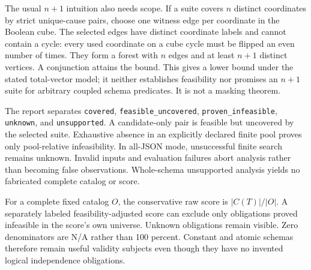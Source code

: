 \documentclass[sigconf,nonacm]{acmart}
\begin{document}
The usual $n+1$ intuition also needs scope. If a suite covers $n$ distinct coordinates by strict unique-cause pairs, choose one witness edge per coordinate in the Boolean cube. The selected edges have distinct coordinate labels and cannot contain a cycle: every used coordinate on a cube cycle must be flipped an even number of times. They form a forest with $n$ edges and at least $n+1$ distinct vertices. A conjunction attains the bound. This gives a lower bound under the stated total-vector model; it neither establishes feasibility nor promises an $n+1$ suite for arbitrary coupled schema predicates. It is not a masking theorem.

The report separates \texttt{c\allowbreak{}o\allowbreak{}v\allowbreak{}e\allowbreak{}r\allowbreak{}e\allowbreak{}d}, \texttt{f\allowbreak{}e\allowbreak{}a\allowbreak{}s\allowbreak{}i\allowbreak{}b\allowbreak{}l\allowbreak{}e\allowbreak{}\_\allowbreak{}u\allowbreak{}n\allowbreak{}c\allowbreak{}o\allowbreak{}v\allowbreak{}e\allowbreak{}r\allowbreak{}e\allowbreak{}d}, \texttt{p\allowbreak{}r\allowbreak{}o\allowbreak{}v\allowbreak{}e\allowbreak{}n\allowbreak{}\_\allowbreak{}i\allowbreak{}n\allowbreak{}f\allowbreak{}e\allowbreak{}a\allowbreak{}s\allowbreak{}i\allowbreak{}b\allowbreak{}l\allowbreak{}e}, \texttt{u\allowbreak{}n\allowbreak{}k\allowbreak{}n\allowbreak{}o\allowbreak{}w\allowbreak{}n}, and \texttt{u\allowbreak{}n\allowbreak{}s\allowbreak{}u\allowbreak{}p\allowbreak{}p\allowbreak{}o\allowbreak{}r\allowbreak{}t\allowbreak{}e\allowbreak{}d}. A candidate-only pair is feasible but uncovered by the selected suite. Exhaustive absence in an explicitly declared finite pool proves only pool-relative infeasibility. In all-JSON mode, unsuccessful finite search remains unknown. Invalid inputs and evaluation failures abort analysis rather than becoming false observations. Whole-schema unsupported analysis yields no fabricated complete catalog or score.

For a complete fixed catalog $O$, the conservative raw score is $|C(T)|/|O|$. A separately labeled feasibility-adjusted score can exclude only obligations proved infeasible in the score's own universe. Unknown obligations remain visible. Zero denominators are N/A rather than 100 percent. Constant and atomic schemas therefore remain useful validity subjects even though they have no invented logical independence obligations.
\end{document}
